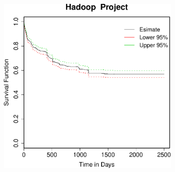 \begin{figure}[t]
\begin{subfigure}[b]{0.31\textwidth}
	\end{subfigure}
	~
	~
	\begin{subfigure}[b]{0.31\textwidth}
		\includegraphics[width=\textwidth]{figures/Survival/hadoop.pdf}
	\end{subfigure}
	

\end{figure}
